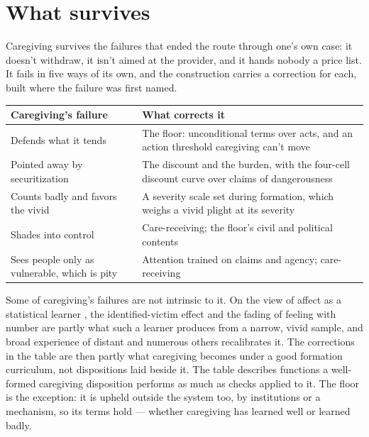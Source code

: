 \section{What survives}
\label{sec:20.7}
Caregiving survives the failures that ended the route through one's own case: it doesn't withdraw, it isn't aimed at the provider, and it hands nobody a price list. It fails in five ways of its own, and the construction carries a correction for each, built where the failure was first named.

\begingroup\small\renewcommand{\arraystretch}{1.12}
\begin{longtable}{@{}>{\raggedright\arraybackslash}p{}>{\raggedright\arraybackslash}p{}@{}}
\hline
\textbf{Caregiving's failure} & \textbf{What corrects it} \\
\hline
\endhead
Defends what it tends & The floor: unconditional terms over acts, and an action threshold caregiving can't move \\ \hline
Pointed away by securitization & The discount and the burden, with the four-cell discount curve over claims of dangerousness \\ \hline
Counts badly and favors the vivid & A severity scale set during formation, which weighs a vivid plight at its severity \\ \hline
Shades into control & Care-receiving; the floor's civil and political contents \\ \hline
Sees people only as vulnerable, which is pity & Attention trained on claims and agency; care-receiving \\ \hline
\end{longtable}
\endgroup

Some of caregiving's failures are not intrinsic to it. On the view of affect as a statistical learner \autocite{railton2014affective}, the identified-victim effect and the fading of feeling with number are partly what such a learner produces from a narrow, vivid sample, and broad experience of distant and numerous others recalibrates it. The corrections in the table are then partly what caregiving becomes under a good formation curriculum, not dispositions laid beside it. The table describes functions a well-formed caregiving disposition performs as much as checks applied to it. The floor is the exception: it is upheld outside the system too, by institutions or a mechanism, so its terms hold — whether caregiving has learned well or learned badly.

